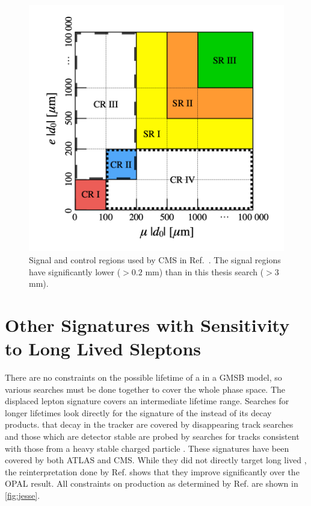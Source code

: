 \begin{figure}[!h]
\centering
\includegraphics[width=.6\textwidth]{figures/theory/cms-dl.png}
\caption{Signal and control regions used by CMS in Ref.~\cite{cms-dl}. The signal regions have significantly lower \absdz ($> 0.2$ mm) than in this thesis search ($> 3$ mm).}
\label{fig:cms-regions}
\end{figure}


\section{Other Signatures with Sensitivity to Long Lived Sleptons}

There are no constraints on the possible lifetime of a \slep in a \ac{GMSB} model, so various searches must be done together to cover the whole phase space. The displaced lepton signature covers an intermediate lifetime range. Searches for longer lifetimes look directly for the signature of the \slep instead of its decay products. \slep that decay in the tracker are covered by disappearing track searches \cite{SUSY-2016-06,CMS-EXO-16-044,SUSY-2011-14,CMS-EXO-12-034} and those which are detector stable are probed by searches for tracks consistent with those from a heavy stable charged particle \cite{SUSY-2016-02,SUSY-2011-03,CMS-EXO-16-044}. These signatures have been covered by both \ac{ATLAS} and \ac{CMS}. While they did not directly target long lived \slep, the reinterpretation done by Ref. \cite{jesseshelton} shows that they improve significantly over the OPAL result. All constraints on \slep production as determined by Ref. \cite{jesseshelton} are shown in \autoref{fig:jesse}. 

